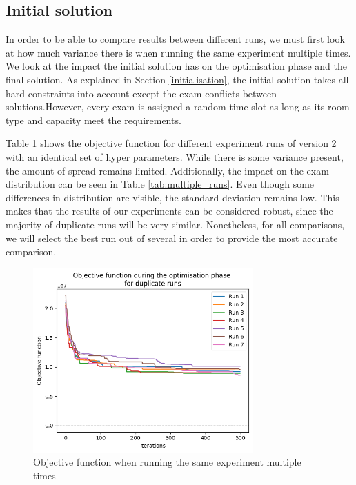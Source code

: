 \subsection{Initial solution} \label{initial}

In order to be able to compare results between different runs, we must first look at how much variance there is when running the same experiment multiple times. We look at the impact the initial solution has on the optimisation phase and the final solution. As explained in Section \ref{initialisation}, the initial solution takes all hard constraints into account except the exam conflicts between solutions.However, every exam is assigned a random time slot as long as its room type and capacity meet the requirements.

Table \ref{fig:multiple_runs} shows the objective function for different experiment runs of version 2 with an identical set of hyper parameters. While there is some variance present, the amount of spread remains limited. Additionally, the impact on the exam distribution can be seen in Table \ref{tab:multiple_runs}. Even though some differences in distribution are visible, the standard deviation remains low. This makes that the results of our experiments can be considered robust, since the majority of duplicate runs will be very similar. Nonetheless, for all comparisons, we will select the best run out of several in order to provide the most accurate comparison.

\begin{figure}[H]
	\centering
	\includegraphics[width=0.75\textwidth]{images/initial/multiple_runs.png} 
	\caption{Objective function when running the same experiment multiple times}
	\label{fig:multiple_runs}
\end{figure}

